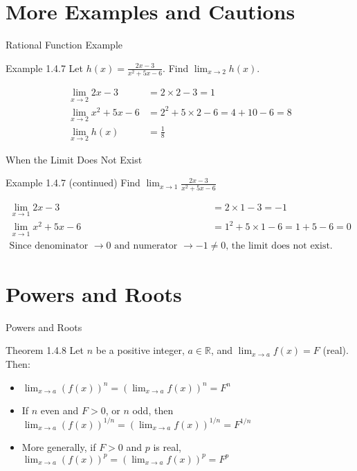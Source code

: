 \documentclass[aspectratio=169]{beamer}
\newcommand{\limx}[2]{\lim_{x \to #1} #2}
\begin{document}
\section{More Examples and Cautions}

\begin{frame}{Rational Function Example}
\begin{block}{Example 1.4.7}
Let $h(x) = \frac{2x-3}{x^2+5x-6}$. Find $\limx{2}{h(x)}$.
\end{block}
\begin{align*}
  \limx{2}{2x-3} &= 2 \times 2 - 3 = 1 \\
  \limx{2}{x^2+5x-6} &= 2^2 + 5 \times 2 - 6 = 4 + 10 - 6 = 8 \\
  \limx{2}{h(x)} &= \frac{1}{8}
\end{align*}
\end{frame}

\begin{frame}{When the Limit Does Not Exist}
\begin{block}{Example 1.4.7 (continued)}
Find $\limx{1}{\frac{2x-3}{x^2+5x-6}}$
\end{block}
\begin{align*}
  \limx{1}{2x-3} &= 2 \times 1 - 3 = -1 \\
  \limx{1}{x^2+5x-6} &= 1^2 + 5 \times 1 - 6 = 1 + 5 - 6 = 0 \\
  \text{Since denominator $\to 0$ and numerator $\to -1 \neq 0$, the limit does not exist.}
\end{align*}
\end{frame}

\section{Powers and Roots}

\begin{frame}{Powers and Roots}
\begin{block}{Theorem 1.4.8}
Let $n$ be a positive integer, $a \in \mathbb{R}$, and $\limx{a}{f(x)} = F$ (real). Then:
\begin{itemize}
  \item $\limx{a}{(f(x))^n} = (\limx{a}{f(x)})^n = F^n$
  \item If $n$ even and $F > 0$, or $n$ odd, then $\limx{a}{(f(x))^{1/n}} = (\limx{a}{f(x)})^{1/n} = F^{1/n}$
  \item More generally, if $F > 0$ and $p$ is real, $\limx{a}{(f(x))^p} = (\limx{a}{f(x)})^p = F^p$
\end{itemize}
\end{block}
\end{frame}
\end{document}
